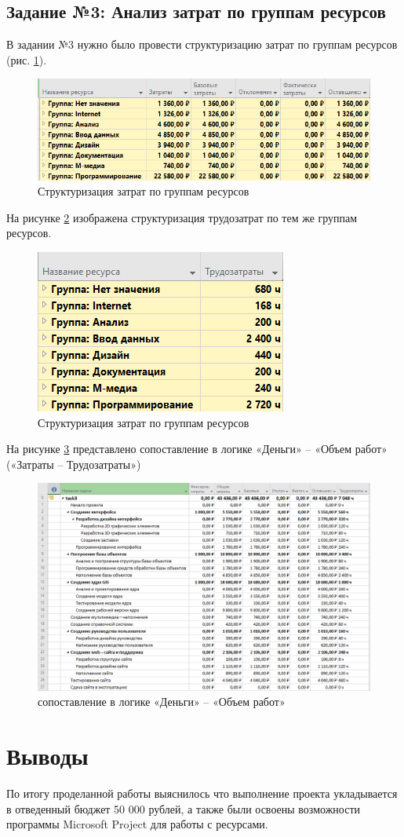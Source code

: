 \newpage
\subsection*{Задание №3: Анализ затрат по группам ресурсов}
В задании №3 нужно было провести структуризацию затрат по группам ресурсов (рис. \ref{p7}).
\begin{figure}[!h]
	\centering
	\includegraphics[width=1\linewidth]{inc/img/7.png}
	\caption{Структуризация затрат по группам ресурсов}
	\label{p7}
\end{figure}

На рисунке \ref{p8} изображена структуризация трудозатрат по тем же группам ресурсов.
\begin{figure}[!h]
	\centering
	\includegraphics[width=0.6\linewidth]{inc/img/8.png}
	\caption{Структуризация затрат по группам ресурсов}
	\label{p8}
\end{figure}

\newpage
На рисунке \ref{p9} представлено сопоставление в логике «Деньги» – «Объем работ» («Затраты – Трудозатраты»)
\begin{figure}[!h]
	\centering
	\includegraphics[width=1\linewidth]{inc/img/9.png}
	\caption{сопоставление в логике «Деньги» – «Объем работ»}
	\label{p9}
\end{figure}

\section*{Выводы}
По итогу проделанной работы выяснилось что выполнение проекта укладывается в отведенный бюджет 50 000 рублей, а также были освоены возможности программы Microsoft Project для работы с ресурсами.